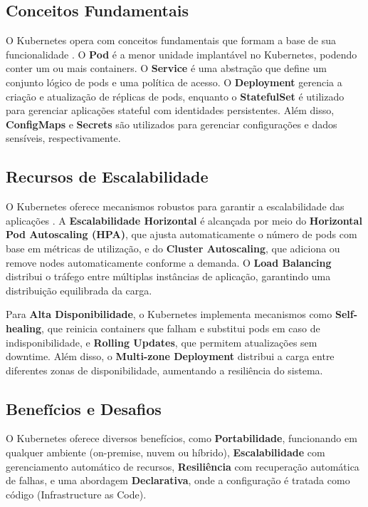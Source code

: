 \subsection{Conceitos Fundamentais}

O Kubernetes opera com conceitos fundamentais que formam a base de sua funcionalidade \cite{hightower2019kubernetes}. O \textbf{Pod} é a menor unidade implantável no Kubernetes, podendo conter um ou mais containers. O \textbf{Service} é uma abstração que define um conjunto lógico de pods e uma política de acesso. O \textbf{Deployment} gerencia a criação e atualização de réplicas de pods, enquanto o \textbf{StatefulSet} é utilizado para gerenciar aplicações stateful com identidades persistentes. Além disso, \textbf{ConfigMaps} e \textbf{Secrets} são utilizados para gerenciar configurações e dados sensíveis, respectivamente.

\subsection{Recursos de Escalabilidade}

O Kubernetes oferece mecanismos robustos para garantir a escalabilidade das aplicações \cite{luksa2021kubernetes}. A \textbf{Escalabilidade Horizontal} é alcançada por meio do \textbf{Horizontal Pod Autoscaling (HPA)}, que ajusta automaticamente o número de pods com base em métricas de utilização, e do \textbf{Cluster Autoscaling}, que adiciona ou remove nodes automaticamente conforme a demanda. O \textbf{Load Balancing} distribui o tráfego entre múltiplas instâncias de aplicação, garantindo uma distribuição equilibrada da carga.

Para \textbf{Alta Disponibilidade}, o Kubernetes implementa mecanismos como \textbf{Self-healing}, que reinicia containers que falham e substitui pods em caso de indisponibilidade, e \textbf{Rolling Updates}, que permitem atualizações sem downtime. Além disso, o \textbf{Multi-zone Deployment} distribui a carga entre diferentes zonas de disponibilidade, aumentando a resiliência do sistema.

\subsection{Benefícios e Desafios}

O Kubernetes oferece diversos benefícios, como \textbf{Portabilidade}, funcionando em qualquer ambiente (on-premise, nuvem ou híbrido), \textbf{Escalabilidade} com gerenciamento automático de recursos, \textbf{Resiliência} com recuperação automática de falhas, e uma abordagem \textbf{Declarativa}, onde a configuração é tratada como código (Infrastructure as Code).

